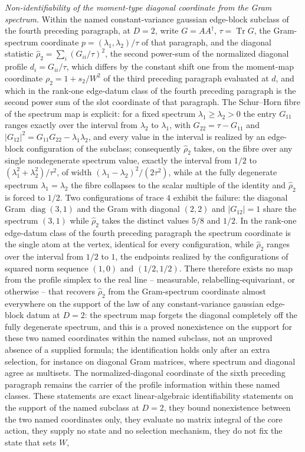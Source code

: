 \emph{Non-identifiability of the moment-type diagonal coordinate from the Gram spectrum.} Within the named constant-variance gaussian edge-block subclass of the fourth preceding paragraph, at \(D=2\), write \(G=AA^{\dagger}\), \(\tau=\operatorname{Tr}G\), the Gram-spectrum coordinate \(p=(\lambda_{1},\lambda_{2})/\tau\) of that paragraph, and the diagonal statistic \(\hat\rho_{2}=\sum_{i}(G_{ii}/\tau)^{2}\), the second power-sum of the normalized diagonal profile \(d_{i}=G_{ii}/\tau\), which differs by the constant shift one from the moment-map coordinate \(\rho_{2}=1+s_{2}/W^{2}\) of the third preceding paragraph evaluated at \(d\), and which in the rank-one edge-datum class of the fourth preceding paragraph is the second power sum of the slot coordinate of that paragraph. The Schur--Horn fibre of the spectrum map is explicit: for a fixed spectrum \(\lambda_{1}\ge\lambda_{2}>0\) the entry \(G_{11}\) ranges exactly over the interval from \(\lambda_{2}\) to \(\lambda_{1}\), with \(G_{22}=\tau-G_{11}\) and \(\lvert G_{12}\rvert^{2}=G_{11}G_{22}-\lambda_{1}\lambda_{2}\), and every value in the interval is realized by an edge-block configuration of the subclass; consequently \(\hat\rho_{2}\) takes, on the fibre over any single nondegenerate spectrum value, exactly the interval from \(1/2\) to \((\lambda_{1}^{2}+\lambda_{2}^{2})/\tau^{2}\), of width \((\lambda_{1}-\lambda_{2})^{2}/(2\tau^{2})\), while at the fully degenerate spectrum \(\lambda_{1}=\lambda_{2}\) the fibre collapses to the scalar multiple of the identity and \(\hat\rho_{2}\) is forced to \(1/2\). Two configurations of trace \(4\) exhibit the failure: the diagonal Gram \(\operatorname{diag}(3,1)\) and the Gram with diagonal \((2,2)\) and \(\lvert G_{12}\rvert=1\) share the spectrum \((3,1)\) while \(\hat\rho_{2}\) takes the distinct values \(5/8\) and \(1/2\). In the rank-one edge-datum class of the fourth preceding paragraph the spectrum coordinate is the single atom at the vertex, identical for every configuration, while \(\hat\rho_{2}\) ranges over the interval from \(1/2\) to \(1\), the endpoints realized by the configurations of squared norm sequence \((1,0)\) and \((1/2,1/2)\). There therefore exists no map from the profile simplex to the real line -- measurable, relabelling-equivariant, or otherwise -- that recovers \(\hat\rho_{2}\) from the Gram-spectrum coordinate almost everywhere on the support of the law of any constant-variance gaussian edge-block datum at \(D=2\): the spectrum map forgets the diagonal completely off the fully degenerate spectrum, and this is a proved nonexistence on the support for these two named coordinates within the named subclass, not an unproved absence of a supplied formula; the identification holds only after an extra selection, for instance on diagonal Gram matrices, where spectrum and diagonal agree as multisets. The normalized-diagonal coordinate of the sixth preceding paragraph remains the carrier of the profile information within these named classes. These statements are exact linear-algebraic identifiability statements on the support of the named subclass at \(D=2\), they bound nonexistence between the two named coordinates only, they evaluate no matrix integral of the core action, they supply no state and no selection mechanism, they do not fix the state that sets \(W\), 